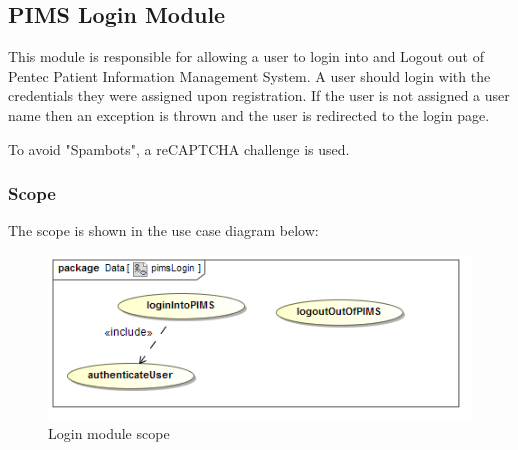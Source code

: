 \subsection{PIMS Login Module}
This module is responsible for allowing a user to login into and Logout out of Pentec Patient Information Management System. A user should login with the credentials they were assigned upon registration. If the user is not assigned a user name then an exception is thrown and the user is redirected to the login page. \par 

To avoid "Spambots", a reCAPTCHA challenge is used. 

\subsubsection{Scope}
The scope is shown in the use case diagram below: \par
\begin{figure}[H]
	\centerline{\includegraphics[width=0.75\linewidth]{./Graphics/pimsLogin/pimsLogin}}
	\caption{Login module scope}
\end{figure}

